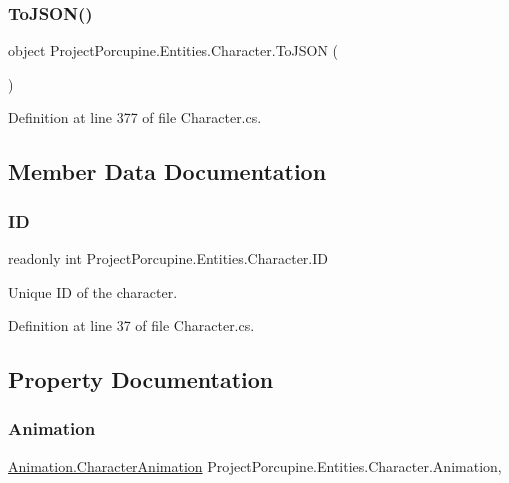 \subsubsection{\texorpdfstring{To\+J\+S\+O\+N()}{ToJSON()}}
{\footnotesize\ttfamily object Project\+Porcupine.\+Entities.\+Character.\+To\+J\+S\+ON (\begin{DoxyParamCaption}{ }\end{DoxyParamCaption})}



Definition at line 377 of file Character.\+cs.



\subsection{Member Data Documentation}
\mbox{\label{class_project_porcupine_1_1_entities_1_1_character_a0e5fccdb1459c7c2ab72c2f6e8faf3ec}} 
\subsubsection{\texorpdfstring{ID}{ID}}
{\footnotesize\ttfamily readonly int Project\+Porcupine.\+Entities.\+Character.\+ID}



Unique ID of the character. 



Definition at line 37 of file Character.\+cs.



\subsection{Property Documentation}
\mbox{\label{class_project_porcupine_1_1_entities_1_1_character_aaec7ff140a2e9ab0b1866fe0269e28ab}} 
\subsubsection{\texorpdfstring{Animation}{Animation}}
{\footnotesize\ttfamily \hyperlink{class_animation_1_1_character_animation}{Animation.\+Character\+Animation} Project\+Porcupine.\+Entities.\+Character.\+Animation\hspace{0.3cm}{\ttfamily [get]}, {\ttfamily [set]}}




